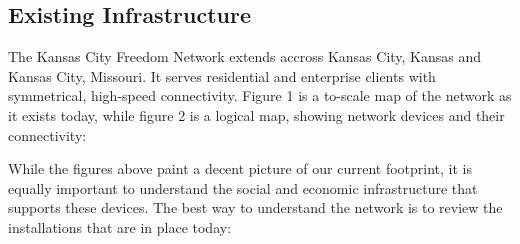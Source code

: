  
\subsection{Existing Infrastructure}
The Kansas City Freedom Network extends accross Kansas City, Kansas and Kansas
City, Missouri. It serves residential and enterprise clients with symmetrical,
high-speed connectivity. Figure 1 is a to-scale map of the network as it exists
today, while figure 2 is a logical map, showing network devices and their
connectivity: \\

\begin{center}
\end{center}

While the figures above paint a decent picture of our current footprint, it is
equally important to understand the social and economic
infrastructure that supports these devices. The best way to understand the
network is to review the installations that are in place today:

